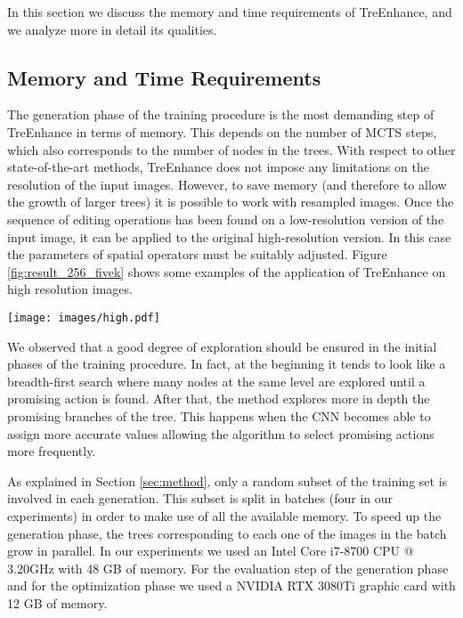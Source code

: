 \documentclass[3p,twocolumn]{elsarticle}
\newcommand{\method}[0]{TreEnhance}
\begin{document}
In this section we discuss the memory and time requirements of \method{}, and we analyze more in detail its qualities.

\subsection{Memory and Time Requirements}
The generation phase of the training procedure is the most demanding step of \method{} in terms of memory. This depends on the number of MCTS  steps, which also corresponds to the number of nodes in the trees.
With respect to other state-of-the-art methods, \method{} does not impose any limitations on the resolution of the input images.  However, to save memory (and therefore to allow the growth of larger trees) it is possible to work with resampled images.
Once the sequence of editing operations has been found on a low-resolution version of the input image, it can be applied to the original high-resolution version.  In this case the parameters of spatial operators must be suitably adjusted.
Figure \ref{fig:result_256_fivek} shows some examples of the application of \method{} on high resolution images.

\begin{figure*}
    \centering
        \texttt{[image: images/high.pdf]}
    \caption{Examples of the application of \method{} to high resolution test images from the Five-k and LOL datasets.}
    \label{fig:result_256_fivek}
\end{figure*}

We observed that a good degree of exploration should be ensured in the initial phases of the training procedure. 
In fact, at the beginning it tends to look like a breadth-first search where many nodes at the same level are explored until a promising action is found.  After that, the method explores more in depth the promising branches of the tree.  This happens when the CNN becomes able to assign more accurate values allowing the algorithm to select promising actions more frequently. 

As explained in Section \ref{sec:method}, only a random subset of the training set is involved in each generation. This subset is split in batches (four in our experiments) in order to make use of all the available memory. To speed up the generation phase, the trees corresponding to each one of the images in the batch grow in parallel.  In our experiments we used an Intel\textregistered{} Core\texttrademark{} i7-8700 CPU @ 3.20GHz with 48 GB of memory.  For the evaluation step of the generation phase and for the optimization phase we used a NVIDIA RTX\texttrademark{} 3080Ti graphic card with 12 GB of memory. 
\end{document}
